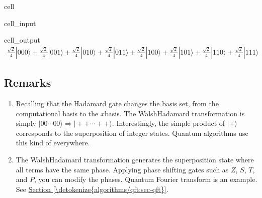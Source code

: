 \documentclass[letterpaper,10pt,english]{jupyterBook}
\begin{document}
\begin{sphinxuseclass}{cell}\begin{sphinxVerbatimInput}

\begin{sphinxuseclass}{cell_input}
\begin{sphinxVerbatim}[commandchars=\\\{\}]
   
\end{sphinxVerbatim}

\end{sphinxuseclass}\end{sphinxVerbatimInput}
\begin{sphinxVerbatimOutput}

\begin{sphinxuseclass}{cell_output}\begin{equation*}
\begin{split}\frac{\sqrt{2}}{4} |000\rangle+\frac{\sqrt{2}}{4} |001\rangle+\frac{\sqrt{2}}{4} |010\rangle+\frac{\sqrt{2}}{4} |011\rangle+\frac{\sqrt{2}}{4} |100\rangle+\frac{\sqrt{2}}{4} |101\rangle+\frac{\sqrt{2}}{4} |110\rangle+\frac{\sqrt{2}}{4} |111\rangle\end{split}
\end{equation*}
\end{sphinxuseclass}\end{sphinxVerbatimOutput}

\end{sphinxuseclass}

\subsection{Remarks}
\label{\detokenize{algorithms/walshhadamard:remarks}}\begin{enumerate}
%
\item {}
\sphinxAtStartPar
Recalling that the Hadamard gate changes the basis set, from the computational basis to the \(x\)\sphinxhyphen{}basis.  The Walsh\sphinxhyphen{}Hadamard transformation is simply \(|00 \cdots 00\rangle \Rightarrow |++ \cdots ++\rangle\).  Interestingly, the simple product of \(|+\rangle\) corresponds to the superposition of integer states.  Quantum algorithms use this kind of  everywhere.

\item {}
\sphinxAtStartPar
The Walsh\sphinxhyphen{}Hadamard transformation generates the superposition state where all terms have the same phase.  Applying phase shifting gates such as \(Z\), \(S\), \(T\), and \(P\), you can modify the phases. Quantum Fourier transform is an example.  See \hyperref[\detokenize{algorithms/qft:sec-qft}]{Section \ref{\detokenize{algorithms/qft:sec-qft}}}.

\end{enumerate}
\end{document}
